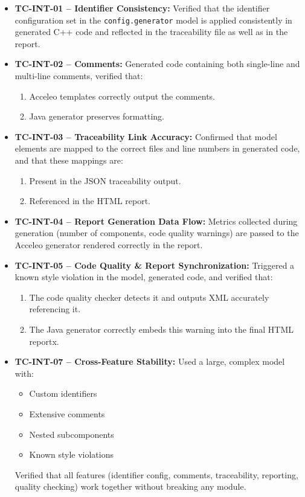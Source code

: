 \begin{itemize}
	\item \textbf{TC-INT-01 – Identifier Consistency:} Verified that the identifier configuration set in the \texttt{config.generator} model is applied consistently in generated C++ code and reflected in the traceability file as well as in the report.
	
	\item \textbf{TC-INT-02 – Comments:} Generated code containing both single-line and multi-line comments, verified that:
	\begin{enumerate}
		\item Acceleo templates correctly output the comments.
		\item Java generator preserves formatting.
	\end{enumerate}
	
	\item \textbf{TC-INT-03 – Traceability Link Accuracy:} Confirmed that model elements are mapped to the correct files and line numbers in generated code, and that these mappings are:
	\begin{enumerate}
		\item Present in the \gls{JSON} traceability output.
		\item Referenced in the \gls{HTML} report.
	\end{enumerate}
	
	\item \textbf{TC-INT-04 – Report Generation Data Flow:} Metrics collected during generation (number of components, code quality warnings) are passed to the Acceleo generator rendered correctly in the report.
	
	\item \textbf{TC-INT-05 – Code Quality \& Report Synchronization:} Triggered a known style violation in the model, generated code, and verified that:
	\begin{enumerate}
		\item The code quality checker detects it and outputs XML accurately referencing it.
		\item The Java generator correctly embeds this warning into the final HTML reportx.
	\end{enumerate}
	
	\item \textbf{TC-INT-07 – Cross-Feature Stability:} Used a large, complex model with:
	\begin{itemize}
		\item Custom identifiers
		\item Extensive comments
		\item Nested subcomponents
		\item Known style violations
	\end{itemize}
	Verified that all features (identifier config, comments, traceability, reporting, quality checking) work together without breaking any module.
\end{itemize}

